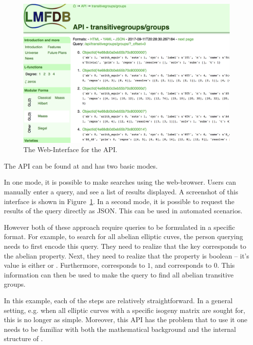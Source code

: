 \begin{figure}[h]
  \begin{center}
    \includegraphics[width=\textwidth]{APIScreenshot.png}
  \end{center}

  \caption[The Web-Interface for the \lmfdb API. ]{
    The Web-Interface for the \lmfdb API. 
  }
  \label{fig:apiscreenshot}
\end{figure}
The \lmfdb API can be found at  and has two basic modes. 

In one mode, it is possible to make searches using the web-browser. 
Users can manually enter a query, and see a list of results displayed. 
A screenshot of this interface is shown in Figure~\ref{fig:apiscreenshot}. 
In a second mode, it is possible to request the results of the query directly as JSON. 
This can be used in automated scenarios. 

However both of these approach require queries to be formulated in a specific format.
For example, to search for all abelian elliptic cuves, the person querying \lmfdb needs to first encode this query. 
They need to realize that the  key corresponds to the abelian property. 
Next, they need to realize that the property is boolean -- it's value is either  or . 
Furthermore,  corresponds to $1$, and  corresponds to $0$. 
This information can then be used to make the query  to find all abelian transitive groups. 

In this example, each of the steps are relatively straightforward. 
In a general setting, e.g. when all elliptic curves with a specific isogeny matrix are sought for, this is no longer as simple. 
Moreover, this API has the problem that to use it one needs to be familiar with both the mathematical background and the internal structure of \lmfdb. 


